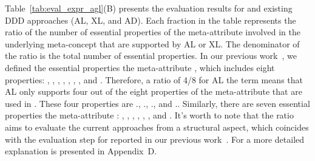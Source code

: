 

Table~\ref{tab:eval_expr_agl}(B) presents the evaluation results for \agldcsl and existing DDD approaches (AL, XL, and AD). Each fraction in the table represents the ratio of the number of essential properties of the meta-attribute involved in the underlying meta-concept that are supported by AL or XL. The denominator of the ratio is the total number of essential properties. In our previous work~\cite{le_domain_2018}, we defined the essential properties \wrt the meta-attribute , which includes eight properties: , , , , , , , and . Therefore, a ratio of 4/8 for AL \wrt the term  means that AL only supports four out of the eight properties of the meta-attribute  that are used in . These four properties are ., 
., 
., and 
.. Similarly, there are seven essential properties \wrt the meta-attribute : , , , , , , and . It's worth to note that the ratio aims to evaluate the current approaches from a structural aspect, which coincides with the evaluation step for \dcsl reported in our previous work~\cite{le_domain_2018}. For a more detailed explanation is presented in Appendix~D.

